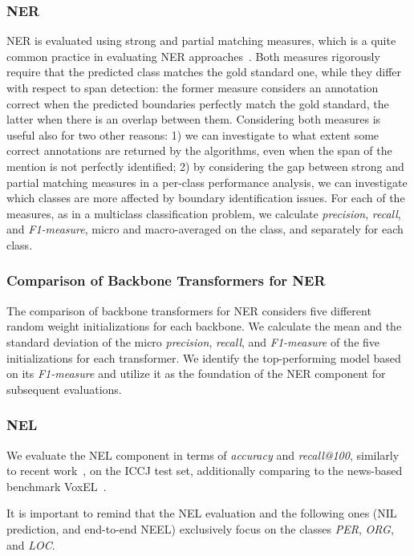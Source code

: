 \subsubsection{NER}
NER is evaluated using strong and partial matching measures, which is a quite common practice in evaluating NER approaches~\cite{tsai2006various}. Both measures rigorously require that the predicted class matches the gold standard one, while they differ with respect to span detection: the former measure considers an annotation correct when the predicted boundaries perfectly match the gold standard, the latter when there is an overlap between them.
Considering both measures is useful also for two other reasons: 1) we can investigate to what extent some correct annotations are returned by the algorithms, even when the span of the mention is not perfectly identified; 2) by considering the gap between strong and partial matching measures in a per-class performance analysis, we can investigate which classes are more affected by boundary identification issues.
For each of the measures, as in a multiclass classification problem, we calculate \textit{precision}, \textit{recall}, and \textit{F1-measure}, micro and macro-averaged on the class, and separately for each class.

\subsubsection{Comparison of Backbone Transformers for NER}
The comparison of backbone transformers for NER considers five different random weight initializations for each backbone. We calculate the mean and the standard deviation of the micro \textit{precision}, \textit{recall}, and \textit{F1-measure} of the five initializations for each transformer.
We identify the top-performing model based on its \textit{F1-measure} and utilize it as the foundation of the NER component for subsequent evaluations.

\subsubsection{NEL}
We evaluate the NEL component in terms of \textit{accuracy} and \textit{recall@100}, similarly to recent work~\cite{blink}, on the ICCJ test set, additionally comparing to the news-based benchmark VoxEL~\cite{rosales2018voxel}.

It is important to remind that the NEL evaluation and the following ones (NIL prediction, and end-to-end NEEL) exclusively focus on the classes \textit{PER}, \textit{ORG}, and \textit{LOC}.

